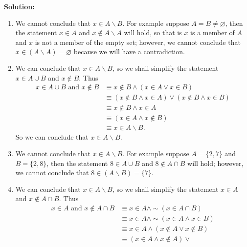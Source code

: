 \begin{enumerate}
      \textbf{Solution:}
      
      \begin{enumerate}
         \item We cannot conclude that $x \in A{\backslash}B$. For example
               suppose $A = B \neq \varnothing$, then the statement $x \in A$
               and $x \notin A{\backslash}A$ will hold, so that is $x$ is a
               member of $A$ and $x$ is not a member of the empty set; however,
               we cannot conclude that $x \in (A{\backslash}A) = \varnothing$
               because we will have a contradiction.
         \item We can conclude that $x \in A{\backslash}B$, so we shall simplify 
               the statement $x \in A \cup B$ and $x \notin B$. Thus
               \begin{align*}
                  x \in A \cup B \text{ and } x \notin B
                     &\equiv x \notin B \land (x \in A \lor x \in B) \\
                     &\equiv (x \notin B \land x \in A) \lor
                             (x \notin B \land x \in B) \\
                     &\equiv x \notin B \land x \in A \\
                     &\equiv (x \in A \land x \notin B)\\
                     &\equiv x \in A{\backslash}B.
               \end{align*}
               So we can conclude that $x \in A{\backslash}B$.
         \item We cannot conclude that $x \in A{\backslash}B$. For example
               suppose $A = \{2, 7\}$ and $B = \{2, 8\}$, then the statement
               $8 \in A \cup B$ and $8 \notin A \cap B$ will hold; however, we
               cannot conclude that $8 \in (A{\backslash}B) = \{7\}$.
         \item We can conclude that $x \in A{\backslash}B$, so we shall simplify 
               the statement $x \in A$ and $x \notin A \cap B$. Thus
               \begin{align*}
                  x \in A \text{ and } x \notin A \cap B
                     &\equiv x \in A \land {\sim}(x \in A \cap B) \\
                     &\equiv x \in A \land {\sim}(x \in A \land x \in B) \\
                     &\equiv x \in A \land (x \notin A \lor x \notin B) \\
                     &\equiv (x \in A \land x \notin A) \lor 

\end{align*}
\end{enumerate}
\end{enumerate}
